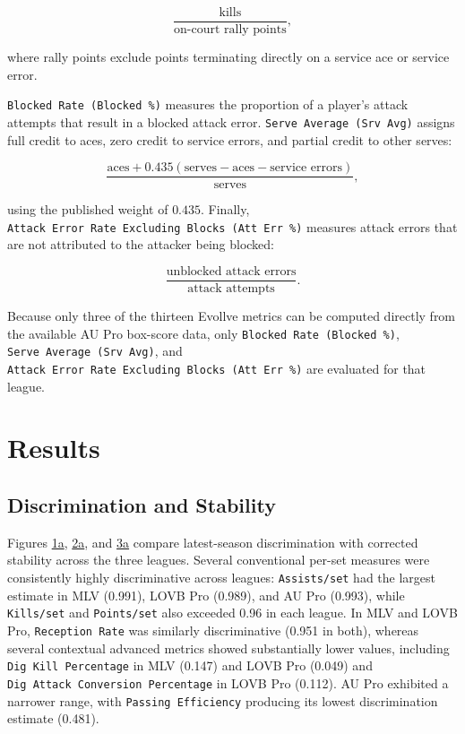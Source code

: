 \documentclass[
  12pt]{article}
\begin{document}
\[
\frac{
\text{kills}
}{
\text{on-court rally points}
},
\]

where rally points exclude points terminating directly on a service ace
or service error.

\texttt{Blocked\ Rate\ (Blocked\ \%)} measures the proportion of a
player's attack attempts that result in a blocked attack error.
\texttt{Serve\ Average\ (Srv\ Avg)} assigns full credit to aces, zero
credit to service errors, and partial credit to other serves:

\[
\frac{
\text{aces}
+
0.435(\text{serves}-\text{aces}-\text{service errors})
}{
\text{serves}
},
\]

using the published weight of \(0.435\). Finally,
\texttt{Attack\ Error\ Rate\ Excluding\ Blocks\ (Att\ Err\ \%)} measures
attack errors that are not attributed to the attacker being blocked:

\[
\frac{
\text{unblocked attack errors}
}{
\text{attack attempts}
}.
\]

Because only three of the thirteen Evollve metrics can be computed
directly from the available AU Pro box-score data, only
\texttt{Blocked\ Rate\ (Blocked\ \%)},
\texttt{Serve\ Average\ (Srv\ Avg)}, and
\texttt{Attack\ Error\ Rate\ Excluding\ Blocks\ (Att\ Err\ \%)} are
evaluated for that league.

\section{Results}\label{results}

\subsection{Discrimination and
Stability}\label{discrimination-and-stability}

Figures \hyperref[fig-meta-mlv]{1a}, \hyperref[fig-meta-lovb]{2a}, and
\hyperref[fig-meta-au]{3a} compare latest-season discrimination with
corrected stability across the three leagues. Several conventional
per-set measures were consistently highly discriminative across leagues:
\texttt{Assists/set} had the largest estimate in MLV (0.991), LOVB Pro
(0.989), and AU Pro (0.993), while \texttt{Kills/set} and
\texttt{Points/set} also exceeded 0.96 in each league. In MLV and LOVB
Pro, \texttt{Reception\ Rate} was similarly discriminative (0.951 in
both), whereas several contextual advanced metrics showed substantially
lower values, including \texttt{Dig\ Kill\ Percentage} in MLV (0.147)
and LOVB Pro (0.049) and \texttt{Dig\ Attack\ Conversion\ Percentage} in
LOVB Pro (0.112). AU Pro exhibited a narrower range, with
\texttt{Passing\ Efficiency} producing its lowest discrimination
estimate (0.481).
\end{document}
